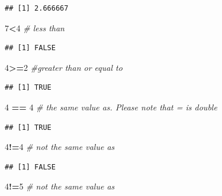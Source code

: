 \documentclass[
]{article}
\newenvironment{Shaded}{\begin{snugshade}}{\end{snugshade}}
\newcommand{\CommentTok}[1]{\textcolor[rgb]{0.56,0.35,0.01}{\textit{#1}}}
\newcommand{\DecValTok}[1]{\textcolor[rgb]{0.00,0.00,0.81}{#1}}
\newcommand{\SpecialCharTok}[1]{\textcolor[rgb]{0.81,0.36,0.00}{\textbf{#1}}}
\begin{document}
\begin{verbatim}
## [1] 2.666667
\end{verbatim}

\begin{Shaded}
\begin{Highlighting}[]
\DecValTok{7}\SpecialCharTok{\textless{}}\DecValTok{4} \CommentTok{\# less than}
\end{Highlighting}
\end{Shaded}

\begin{verbatim}
## [1] FALSE
\end{verbatim}

\begin{Shaded}
\begin{Highlighting}[]
\DecValTok{4}\SpecialCharTok{\textgreater{}=}\DecValTok{2} \CommentTok{\#greater than or equal to}
\end{Highlighting}
\end{Shaded}

\begin{verbatim}
## [1] TRUE
\end{verbatim}

\begin{Shaded}
\begin{Highlighting}[]
\DecValTok{4} \SpecialCharTok{==} \DecValTok{4} \CommentTok{\# the same value as. Please note that \textasciigrave{}=\textasciigrave{} is double}
\end{Highlighting}
\end{Shaded}

\begin{verbatim}
## [1] TRUE
\end{verbatim}

\begin{Shaded}
\begin{Highlighting}[]
\DecValTok{4}\SpecialCharTok{!=}\DecValTok{4} \CommentTok{\# not the same value as}
\end{Highlighting}
\end{Shaded}

\begin{verbatim}
## [1] FALSE
\end{verbatim}

\begin{Shaded}
\begin{Highlighting}[]
\DecValTok{4}\SpecialCharTok{!=}\DecValTok{5} \CommentTok{\# not the same value as}
\end{Highlighting}
\end{Shaded}
\end{document}
